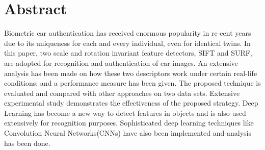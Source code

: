 \chapter*{Abstract} 

Biometric ear authentication has received enormous popularity in re-cent years due to its uniqueness for each and every individual, even for identical twins. In this paper, two scale and rotation invariant feature detectors, SIFT and SURF, are adopted for recognition and authentication of ear images. An extensive analysis has been made on how these two descriptors work under certain real-life conditions; and a performance measure has been given. The proposed technique is evaluated and compared with other approaches on two data sets. Extensive experimental study demonstrates the effectiveness of the proposed strategy. Deep Learning has become a new way to detect features in objects and is also used extensively for recognition purposes. Sophisticated deep learning techniques like Convolution Neural Networks(CNNs) have also been implemented and analysis has been done.

